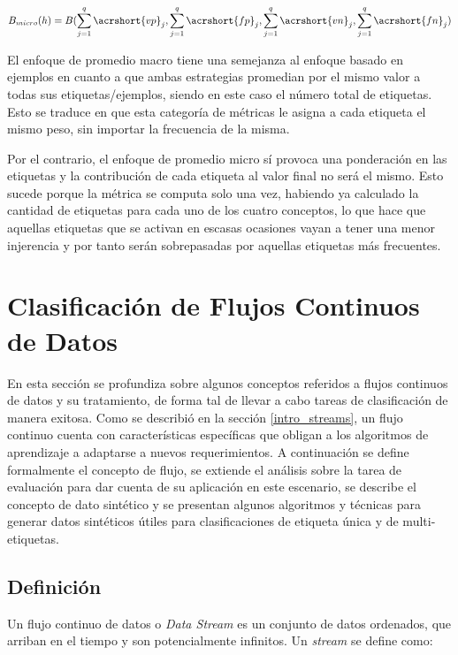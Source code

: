 \begin{equation}
	B_{micro}(h) = B( \sum_{j=1}^{q} \acrshort{vp}_{j}, \sum_{j=1}^{q}
	\acrshort{fp}_{j},\sum_{j=1}^{q}  \acrshort{vn}_{j},\sum_{j=1}^{q}
	\acrshort{fn}_{j})
\end{equation}

El enfoque de promedio macro tiene una semejanza al enfoque basado en ejemplos
en cuanto a que ambas estrategias promedian por el mismo valor a todas sus
etiquetas/ejemplos, siendo en este caso el número total de etiquetas. Esto se
traduce en que esta categoría de métricas le asigna a cada etiqueta el mismo
peso, sin importar la frecuencia de la misma.

Por el contrario, el enfoque de promedio micro sí provoca una ponderación en las
etiquetas y la contribución de cada etiqueta al valor final no será el mismo.
Esto sucede porque la métrica se computa solo una vez, habiendo ya calculado la
cantidad de etiquetas para cada uno de los cuatro conceptos, lo que hace que
aquellas etiquetas que se activan en escasas ocasiones vayan a tener una menor
injerencia y por tanto serán sobrepasadas por aquellas etiquetas más frecuentes.

\section{Clasificación de Flujos Continuos de Datos}

En esta sección se profundiza sobre algunos conceptos referidos a flujos
continuos de datos y su tratamiento, de forma tal de llevar a cabo tareas de
clasificación de manera exitosa.  Como se describió en la sección
\ref{intro_streams}, un flujo continuo cuenta con características específicas
que obligan a los algoritmos de aprendizaje a adaptarse a nuevos requerimientos.
A continuación se define formalmente el concepto de flujo, se extiende el
análisis sobre la tarea de evaluación para dar cuenta de su aplicación en este
escenario, se describe el concepto de dato sintético y se presentan algunos
algoritmos y técnicas para generar datos sintéticos útiles para clasificaciones
de etiqueta única y de multi-etiquetas.

\subsection{Definición}

Un flujo continuo de datos o \textit{Data Stream} es un conjunto de datos
ordenados, que arriban en el tiempo y son potencialmente infinitos. Un
\textit{stream} se define como:

